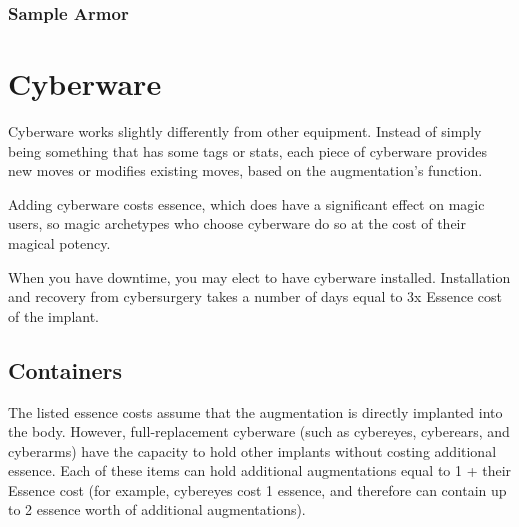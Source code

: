 \subsubsection{Sample Armor}


\section{Cyberware}

Cyberware works slightly differently from other equipment. Instead of simply being something that has some tags or stats, each piece of cyberware provides new moves or modifies existing moves, based on the augmentation’s function.

Adding cyberware costs essence, which does have a significant effect on magic users, so magic archetypes who choose cyberware do so at the cost of their magical potency.

When you have downtime, you may elect to have cyberware installed. Installation and recovery from cybersurgery takes a number of days equal to 3x Essence cost of the implant.

\subsection{Containers}
The listed essence costs assume that the augmentation is directly implanted into the body. However, full-replacement cyberware (such as cybereyes, cyberears, and cyberarms) have the capacity to hold other implants without costing additional essence. Each of these items can hold additional augmentations equal to 1 + their Essence cost (for example, cybereyes cost 1 essence, and therefore can contain up to 2 essence worth of additional augmentations).



